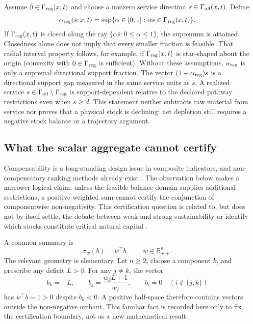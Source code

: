 \documentclass[11pt]{article}
\newcommand{\R}{\mathbb R}
\begin{document}
Assume $0\in\Gamma_{\rm reg}(x,t)$ and choose a nonzero service direction $\bar s\in\Gamma_{\rm all}(x,t)$. Define
\begin{equation}
\alpha_{\rm reg}(\bar s;x,t)
=\sup\{\alpha\in[0,1]:\alpha\bar s\in\Gamma_{\rm reg}(x,t)\}.
\label{eq:regenerative-support}
\end{equation}
If $\Gamma_{\rm reg}(x,t)$ is closed along the ray $\{\alpha\bar s:0\le\alpha\le1\}$, the supremum is attained. Closedness alone does not imply that every smaller fraction is feasible. That radial interval property follows, for example, if $\Gamma_{\rm reg}(x,t)$ is star-shaped about the origin (convexity with $0\in\Gamma_{\rm reg}$ is sufficient). Without these assumptions, $\alpha_{\rm reg}$ is only a supremal directional support fraction.
The vector $(1-\alpha_{\rm reg})\bar s$ is a directional support gap measured in the same service units as $\bar s$. A realized service $s\in\Gamma_{\rm all}\setminus\Gamma_{\rm reg}$ is support-dependent relative to the declared pathway restrictions even when $s\ge d$. This statement neither subtracts raw material from service nor proves that a physical stock is declining; net depletion still requires a negative stock balance or a trajectory argument.

\subsection{What the scalar aggregate cannot certify}

Compensability is a long-standing design issue in composite indicators, and non-compensatory ranking methods already exist \cite{munda2009}. The observation below makes a narrower logical claim: unless the feasible balance domain supplies additional restrictions, a positive weighted sum cannot certify the conjunction of componentwise non-negativity. This certification question is related to, but does not by itself settle, the debate between weak and strong sustainability or identify which stocks constitute critical natural capital \cite{neumayer2013,ekins2003}.

A common summary is
\[
\sigma_w(b)=w^\top b,
\qquad w\in\R_{++}^n.
\]
The relevant geometry is elementary. Let $n\ge2$, choose a component $k$, and prescribe any deficit $L>0$. For any $j\ne k$, the vector
\[
b_k=-L,
\qquad
b_j=\frac{w_kL+1}{w_j},
\qquad
b_i=0\quad(i\notin\{j,k\})
\]
has $w^\top b=1>0$ despite $b_k<0$. A positive half-space therefore contains vectors outside the non-negative orthant. This familiar fact is recorded here only to fix the certification boundary, not as a new mathematical result.
\end{document}
